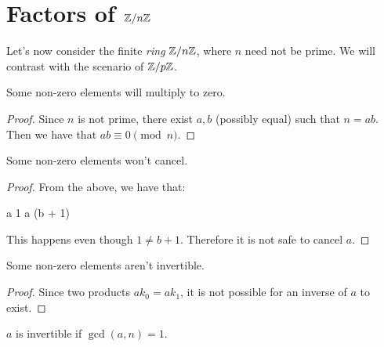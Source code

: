 \section{Factors of $\mathbb{Z} / n\mathbb{Z}$}

Let's now consider the finite \emph{ring} $\mathbb{Z} / n\mathbb{Z}$, where $n$ need not
be prime. We will contrast with the scenario of $\mathbb{Z} / p\mathbb{Z}$.

\begin{lemma}
  Some non-zero elements will multiply to zero.
\end{lemma}

\begin{proof}
  Since $n$ is not prime, there exist $a, b$ (possibly equal) such that
  $n = ab$. Then we have that $ab \equiv 0 \pmod{n}$.
\end{proof}

\begin{lemma}
  Some non-zero elements won't cancel.
\end{lemma}

\begin{proof}
  From the above, we have that:

  \begin{nedqn}
    a 1
  \equivcol
    a (b + 1) 
  \end{nedqn}

  This happens even though $1 \ne b + 1$. Therefore it is not safe to
  cancel $a$.
\end{proof}

\begin{lemma}
  Some non-zero elements aren't invertible.
\end{lemma}

\begin{proof}
  Since two products $ak_0 = ak_1$, it is not possible for an inverse of
  $a$ to exist.
\end{proof}

\begin{lemma}
  $a$ is invertible if $\gcd(a, n) = 1$.
\end{lemma}

